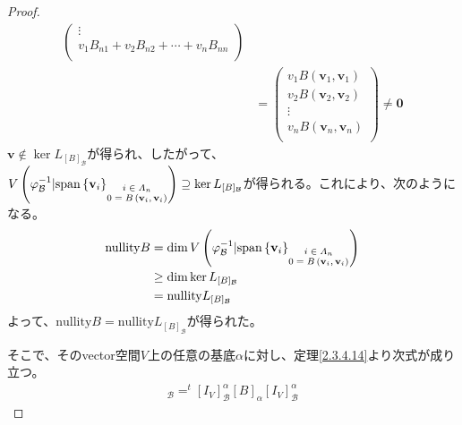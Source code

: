 \documentclass[dvipdfmx]{jsarticle}
\begin{document}
\begin{proof}
\begin{align*}
\begin{pmatrix}
 \vdots \\
v_{1}B_{n1} + v_{2}B_{n2} + \cdots + v_{n}B_{nn} \\
\end{pmatrix}\\
&= \begin{pmatrix}
v_{1}B\left( \mathbf{v}_{1},\mathbf{v}_{1} \right) \\
v_{2}B\left( \mathbf{v}_{2},\mathbf{v}_{2} \right) \\
 \vdots \\
v_{n}B\left( \mathbf{v}_{n},\mathbf{v}_{n} \right) \\
\end{pmatrix} \neq \mathbf{0}
\end{align*}
$\mathbf{v} \notin \ker L_{[ B]_{\mathcal{B}}}$が得られ、したがって、$V\left( \varphi_{\mathcal{B}}^{- 1}|{\mathrm{span}}\left\{ \mathbf{v}_{i} \right\}_{\scriptsize \begin{matrix} i \in \varLambda_{n} \\0 = B\left( \mathbf{v}_{i},\mathbf{v}_{i} \right) \end{matrix}} \right) \supseteq \ker L_{[ B]_{\mathcal{B}}}$が得られる。これにより、次のようになる。
\begin{align*}
{\mathrm{nullity}}B &= \dim{V\left( \varphi_{\mathcal{B}}^{- 1}|{\mathrm{span}}\left\{ \mathbf{v}_{i} \right\}_{\scriptsize \begin{matrix} i \in \varLambda_{n} \\0 = B\left( \mathbf{v}_{i},\mathbf{v}_{i} \right) \end{matrix}} \right)}\\
&\geq \dim{\ker L_{[ B]_{\mathcal{B}}}}\\
&= {\mathrm{nullity}}L_{[ B]_{\mathcal{B}}}
\end{align*}
よって、${\mathrm{nullity}}B = {\mathrm{nullity}}L_{[ B]_{\mathcal{B}}}$が得られた。\par
そこで、そのvector空間$V$上の任意の基底$\alpha$に対し、定理\ref{2.3.4.14}より次式が成り立つ。
\begin{align*}
[ B]_{\mathcal{B}} =^{t}\left[ I_{V} \right]^{\alpha}_{\mathcal{B}}[ B]_{\alpha}\left[ I_{V} \right]^{\alpha}_{\mathcal{B}}
\end{align*}

\end{proof}
\end{document}
